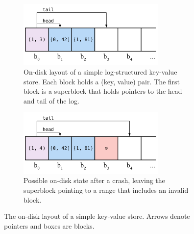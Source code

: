 \begin{figure}
  \centering
  \begin{subfigure}[t]{0.48\textwidth}
    \centering
    \includegraphics[width=0.8\textwidth]{figs/overview-good.pdf}
    \caption{On-disk layout of a simple log-structured key-value store. Each block holds a (key, value) pair.
    The first block is a superblock that holds pointers to the head and tail of the log.}
    \label{fig:overview:layout}
  \end{subfigure}%
  \quad%
  \begin{subfigure}[t]{0.48\textwidth}
    \centering
    \includegraphics[width=0.8\textwidth]{figs/overview-crash.pdf}
    \caption{Possible on-disk state after a crash, leaving the superblock pointing to a range that includes an invalid block.}
    \label{fig:overview:crash}
  \end{subfigure}
  \caption{The on-disk layout of a simple key-value store. Arrows denote pointers and boxes are blocks.}
  \label{fig:overview}
\end{figure}

